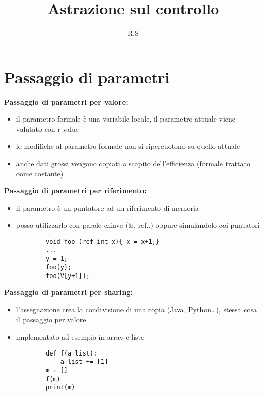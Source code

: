 \documentclass[12pt]{extarticle}
\title{Astrazione sul controllo}
\author{R.S}
\begin{document}
\maketitle

\section*{Passaggio di parametri}

\begin{flushleft}
    
\textbf{Passaggio di parametri per valore:} \\
\begin{itemize}
    \item il parametro formale è una variabile locale, il parametro attuale viene valutato con r-value
    \item le modifiche al parametro formale non si ripercuotono su quello attuale
	\item anche dati grossi vengono copiati a scapito dell'efficienza (formale trattato come costante)
\end{itemize}

\medskip

\textbf{Passaggio di parametri per riferimento:} \\
\begin{itemize}
    \item il parametro è un puntatore ad un riferimento di memoria
    \item posso utilizzarlo con parole chiave (\&, ref..) oppure simulandolo coi puntatori
    \begin{lstlisting}
        void foo (ref int x){ x = x+1;}
        ...
        y = 1;
        foo(y);
        foo(V[y+1]);
    \end{lstlisting}
\end{itemize}

\medskip

\textbf{Passaggio di parametri per sharing:} \\
\begin{itemize}
    \item l'assegnazione crea la condivisione di una copia (Java, Python…), stessa cosa il passaggio per valore
    \item implementato ad esempio in array e liste
    \begin{lstlisting}
        def f(a_list):
            a_list += [1]
        m = []
        f(m)
        print(m)
    \end{lstlisting}
 

\end{itemize}
\end{flushleft}
\end{document}
